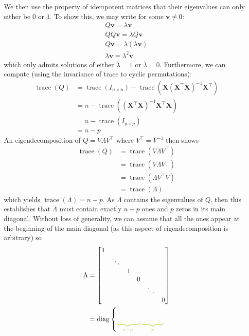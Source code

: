\documentclass[11pt]{report} %
\begin{document}
We then use the property of idempotent matrices that their eigenvalues can only either be $0$ or $1$. To show this, we may write for some $\mathbf{v} \neq 0$:
\begin{gather}
Q\mathbf{v} = \lambda\mathbf{v} \\
QQ\mathbf{v} = \lambda Q\mathbf{v} \\
Q\mathbf{v} = \lambda \left(\lambda\mathbf{v}\right) \\
\lambda\mathbf{v} = \lambda^{2}\mathbf{v}
\end{gather}
which only admits solutions of either $\lambda = 1$ or $\lambda = 0$. Furthermore, we can compute (using the invariance of trace to cyclic permutations):
\begin{align}
\operatorname{trace}\left(Q\right) &= \operatorname{trace}\left(I_{n\times n}\right) -  \operatorname{trace}\left(\mathbf{X}\left(\mathbf{X}^{\top}\mathbf{X}\right)^{-1}\mathbf{X}^{\top}\right) \\
&= n -  \operatorname{trace}\left(\left(\mathbf{X}^{\top}\mathbf{X}\right)^{-1}\mathbf{X}^{\top}\mathbf{X}\right) \\
&= n -  \operatorname{trace}\left(I_{p\times p}\right) \\
&= n - p
\end{align}
An eigendecomposition of $Q = V\Lambda V^{\top}$ where $V^{\top} = V^{-1}$ then shows
\begin{align}
\operatorname{trace}\left(Q\right) &= \operatorname{trace}\left(V\Lambda V^{\top}\right) \\
&= \operatorname{trace}\left(V\Lambda V^{\top}\right) \\
&= \operatorname{trace}\left(\Lambda V^{\top}V\right) \\
&= \operatorname{trace}\left(\Lambda\right)
\end{align}
which yields $\operatorname{trace}\left(\Lambda\right) = n - p$. As $\Lambda$ contains the eigenvalues of $Q$, then this establishes that $\Lambda$ must contain exactly $n - p$ ones and $p$ zeros in its main diagonal. Without loss of generality, we can assume that all the ones appear at the beginning of the main diagonal (as this aspect of eigendecomposition is arbitrary) so
\begin{align}
\Lambda &= \begin{bmatrix}1\\
 & \ddots\\
 &  & 1\\
 &  &  & 0\\
 &  &  &  & \ddots\\
 &  &  &  &  & 0
\end{bmatrix} \\
&= \operatorname{diag}\left\{\green\underbrace{\black 1, \dots, 1}_{\green n - p}\black, \green\underbrace{\black 0, \dots, 0}_{\green p}\black \right\}
\end{align}
\end{document}
